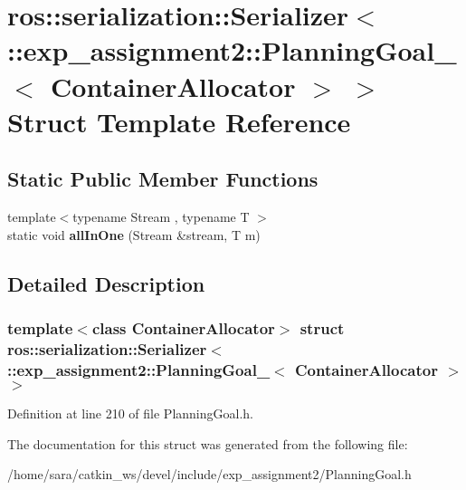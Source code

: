 \hypertarget{structros_1_1serialization_1_1Serializer_3_01_1_1exp__assignment2_1_1PlanningGoal___3_01ContainerAllocator_01_4_01_4}{}\section{ros\+:\+:serialization\+:\+:Serializer$<$ \+:\+:exp\+\_\+assignment2\+:\+:Planning\+Goal\+\_\+$<$ Container\+Allocator $>$ $>$ Struct Template Reference}
\label{structros_1_1serialization_1_1Serializer_3_01_1_1exp__assignment2_1_1PlanningGoal___3_01ContainerAllocator_01_4_01_4}
\subsection*{Static Public Member Functions}
\begin{DoxyCompactItemize}
\item 
\mbox{\label{structros_1_1serialization_1_1Serializer_3_01_1_1exp__assignment2_1_1PlanningGoal___3_01ContainerAllocator_01_4_01_4_ab1bad56261eccdbb6f06097ddc24a39a}} 
{\footnotesize template$<$typename Stream , typename T $>$ }\\static void {\bfseries all\+In\+One} (Stream \&stream, T m)
\end{DoxyCompactItemize}


\subsection{Detailed Description}
\subsubsection*{template$<$class Container\+Allocator$>$\newline
struct ros\+::serialization\+::\+Serializer$<$ \+::exp\+\_\+assignment2\+::\+Planning\+Goal\+\_\+$<$ Container\+Allocator $>$ $>$}



Definition at line 210 of file Planning\+Goal.\+h.



The documentation for this struct was generated from the following file\+:\begin{DoxyCompactItemize}
\item 
/home/sara/catkin\+\_\+ws/devel/include/exp\+\_\+assignment2/Planning\+Goal.\+h\end{DoxyCompactItemize}

